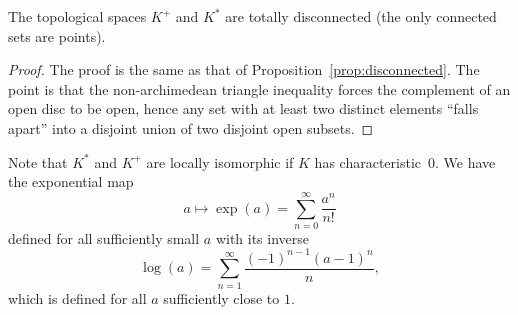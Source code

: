 \documentclass[11pt]{book}
\begin{document}
\begin{ch}
\begin{lemma}
The topological spaces $K^+$ and $K^*$ are totally disconnected (the
only connected sets are points).
\end{lemma}
\begin{proof}
  The proof is the same as that of
  Proposition~\ref{prop:disconnected}.  The point is that the
  non-archimedean triangle inequality forces the complement of an open
  disc to be open, hence any set with at least two distinct elements
  ``falls apart'' into a disjoint union of two disjoint open subsets.
\end{proof}

\begin{remark}
Note that $K^*$ and $K^+$ are locally isomorphic if $K$ has
characteristic~$0$.   We have the exponential map
$$
a \mapsto \exp(a) = \sum_{n=0}^{\infty} \frac{a^n}{n!}
$$
defined for all sufficiently small $a$ with its inverse
$$
\log(a) = \sum_{n=1}^{\infty} \frac{(-1)^{n-1}(a-1)^n}{n},
$$
which is defined for all $a$ sufficiently close to $1$.
\end{remark}
\end{ch}
\end{document}
